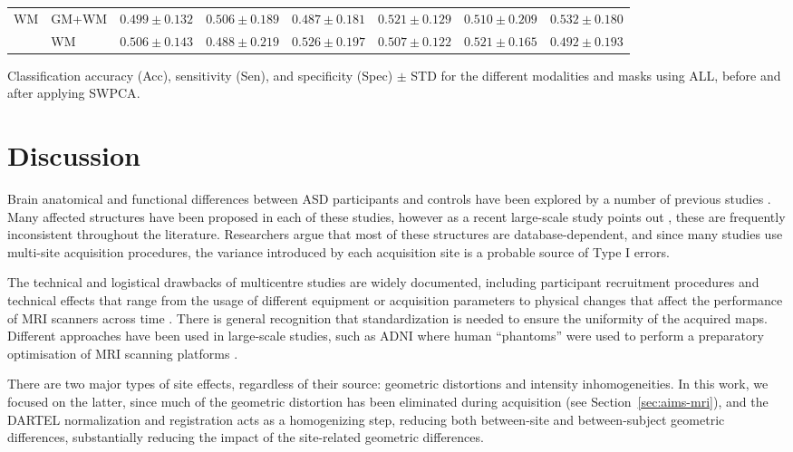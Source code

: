 \begin{bigtable}
\begin{tabularx}{\linewidth}{ll|XXX|XXX}
		\midrule
		\multirow{2}{*}{\ac{WM}} &GM+WM &
		$ 0.499 \pm 0.132 $ & $ 0.506 \pm 0.189 $ & $ 0.487 \pm 0.181 $ & $ 0.521 \pm 0.129 $ & $ 0.510 \pm 0.209 $ &  $ 0.532 \pm 0.180 $ \\
		&
		WM &
		$ 0.506 \pm 0.143 $ & $ 0.488 \pm 0.219 $ & $ 0.526 \pm 0.197 $ & $ 0.507 \pm 0.122 $ & $ 0.521 \pm 0.165 $ &   $ 0.492 \pm 0.193 $ \\
		\bottomrule
	\end{tabularx}
	\caption[Classification accuracy (Acc), sensitivity (Sen), and specificity (Spec) $\pm$ STD for the different modalities and masks using ALL, before and after applying \acs{SWPCA}.]{Classification accuracy (Acc), sensitivity (Sen), and specificity (Spec) $\pm$ STD for the different modalities and masks using ALL, before and after applying \ac{SWPCA}.}
	\label{tab:swpcaALL}
\end{bigtable}

\section{Discussion}
Brain anatomical and functional differences between \ac{ASD} participants and controls have been explored by a number of previous studies \cite{DiMartino2014,Ecker2015,Hernandez2015,Lenroot2013,Zuercher2015}. Many affected structures have been proposed in each of these studies, however as a recent large-scale study points out \cite{haar2014anatomical}, these are frequently inconsistent throughout the literature. Researchers argue that most of these structures are database-dependent, and since many studies use multi-site acquisition procedures, the variance introduced by each acquisition site is a probable source of Type I errors. 

The technical and logistical drawbacks of multicentre studies are widely documented, including participant recruitment procedures \cite{Pearlson2009} and technical effects that range from the usage of different equipment or acquisition parameters \cite{VanHorn2009} to physical changes that affect the performance of \ac{MRI} scanners across time \cite{Pearlson2009}. There is general recognition that standardization is needed to ensure the uniformity of the acquired maps. Different approaches have been used in large-scale studies, such as \ac{ADNI} where human ``phantoms'' were used to perform a preparatory optimisation of \ac{MRI} scanning platforms \cite{friedman2006report}. 

There are two major types of site effects, regardless of their source: geometric distortions and intensity inhomogeneities. In this work, we focused on the latter, since much of the geometric distortion has been eliminated during acquisition (see Section~\ref{sec:aims-mri}), and the DARTEL normalization and registration acts as a homogenizing step, reducing both between-site and between-subject geometric differences, substantially reducing the impact of the site-related geometric differences. 

